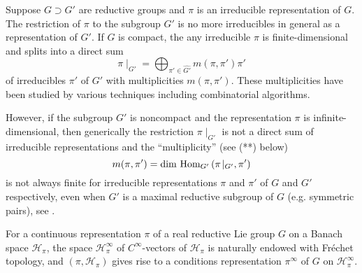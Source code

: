 \documentclass[reqno,12pt]{pja00} %
\newcommand{\Hom}{\mbox{\normalfont Hom}}
\theoremstyle{definition}
\theoremstyle{exampstyle} \newtheorem{examp}[theorem]{Theorem}
\begin{document}
Suppose $G \supset G'$ are reductive groups and $\pi$ is an irreducible
representation of $G$. 
The restriction of $\pi$ to the subgroup $G'$ is no more irreducibles in general as a representation
of $G'$. If $G$ is compact, the any irreducible $\pi$ is finite-dimensional and splits
into a direct sum
\[ \pi\!\mid_{G'} = \bigoplus_{\pi' \in \widehat{G'}} m (\pi, \pi') \pi' \]
of irreducibles $\pi'$ of $G'$ with multiplicities $m(\pi,\pi')$. These multiplicities have been studied
by various techniques including combinatorial algorithms.

However, if the subgroup $G'$ is noncompact and the representation $\pi$ is infinite-dimensional, then generically the restriction $\pi\!\mid_{G'}$
is not a direct sum of irreducible representations \cite{kobayashi1998discrete3} and the ``multiplicity'' (see (**) below)
\begin{equation*}
	m(\pi,\pi')=\dim\,\Hom_{G'}\left( \pi\!\mid_{G'},\pi' \right)
\end{equation*}
is not always finite for irreducible representations $\pi$ and $\pi'$ of $G$ and $G'$ respectively, even when $G'$ is a maximal reductive subgroup of $G$
(e.g. symmetric pairs), see \cite{Kobayashi2014}.

For a continuous representation $\pi$ of a real reductive Lie group $G$ on a Banach space $\mathcal{H}_\pi$, the space $\mathcal{H}_\pi^\infty$
of $C^\infty$-vectors of $\mathcal{H}_\pi$ is naturally endowed with Fr\'echet topology, and $(\pi,\mathcal{H}_\pi)$ gives rise to a conditions representation $\pi^\infty$
of $G$ on $\mathcal{H}_\pi^\infty$.
\end{document}
